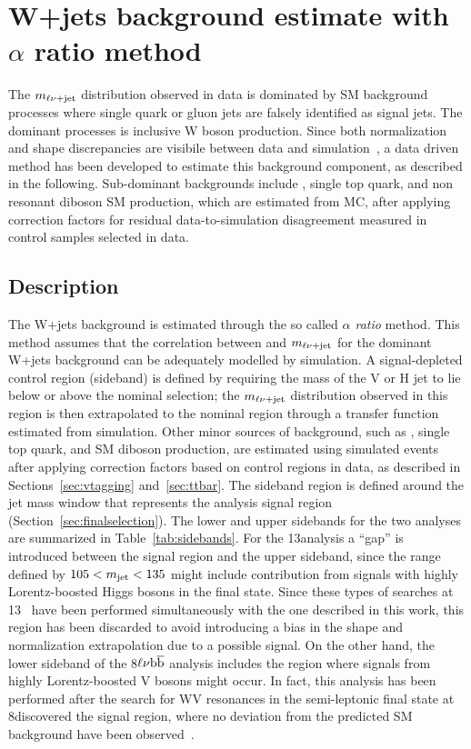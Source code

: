 \section{W+jets background estimate with $\alpha$ ratio method}\label{sec:alpha}

The $m_{\ell\nu+{\rm jet}}$ distribution observed in data is dominated by SM background processes where single
quark or gluon jets are falsely identified as signal jets. The dominant processes is inclusive W boson production. 
Since both normalization and shape discrepancies are visibile between data and simulation~\cite{Chatrchyan:2013vbb},
a data driven method has been developed to estimate this background component, as described in the following.
Sub-dominant backgrounds include \ttbar, single top quark, and non resonant diboson SM production,
which are estimated from MC, after applying correction factors for residual data-to-simulation disagreement measured in control samples selected in data.

\subsection{Description}

The W+jets background is estimated through the so called \textit{$\alpha$ ratio} method.
This method assumes that the correlation between \mJ and $m_{\ell\nu+{\rm jet}}$ for the dominant W+jets background can be adequately modelled by simulation.
A signal-depleted control region (sideband) is defined by requiring the mass of the V or H jet to lie below or above the nominal selection; the
$m_{\ell\nu+{\rm jet}}$ distribution observed in this region is then extrapolated to the nominal region through
a transfer function estimated from simulation. Other minor sources of background, such as
\ttbar, single top quark, and SM diboson production, are estimated using simulated events after
applying correction factors based on control regions in data, as described in Sections~\ref{sec:vtagging} and~\ref{sec:ttbar}.
The sideband region is defined around the jet mass window that represents the analysis signal region (Section~\ref{sec:finalselection}).
The lower and upper sidebands for the two analyses are summarized in Table~\ref{tab:sidebands}.
For the 13\TeV analysis a ``gap'' is introduced between the signal region and the upper sideband, since the
range defined by $105 < m_{\text{jet}} < 135$ might include contribution from signals with highly Lorentz-boosted Higgs bosons in the final state.
Since these types of searches at 13\TeV~\cite{Khachatryan:2016cfx} have been performed simultaneously with the one described in this work,
this region has been discarded to avoid introducing a bias in the shape and normalization extrapolation due to a possible signal.
On the other hand, the lower sideband of the 8\TeV $\ell\nu{\mathrm{b}\overline{\mathrm{b}}}$ analysis includes the region where signals from highly Lorentz-boosted V bosons might occur.
In fact, this analysis has been performed after the search for WV resonances in the semi-leptonic final state at 8\TeV discovered the signal region,
where no deviation from the predicted SM background have been observed~\cite{Khachatryan:2014gha}.

